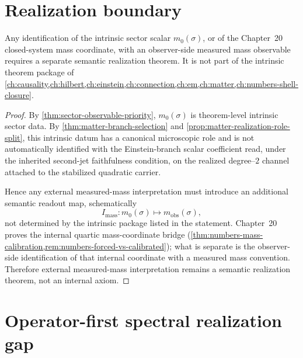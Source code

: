 \section{Realization boundary}
\label{sec:matter-realization-boundary}

\begin{corollary}
\label{cor:mass-boundary}
\label{cor:boundary}
Any identification of the intrinsic sector scalar \(m_0(\sigma)\), or of
the Chapter~20 closed-system mass coordinate, with an observer-side measured
mass observable requires a separate semantic realization theorem.
It is not part of the intrinsic theorem package of
\cref{ch:causality,ch:hilbert,ch:einstein,ch:connection,ch:em,ch:matter,ch:numbers-shell-closure}.
\end{corollary}

\begin{proof}
By \cref{thm:sector-observable-priority},
\(m_0(\sigma)\) is theorem-level intrinsic sector data.
By \cref{thm:matter-branch-selection} and
\cref{prop:matter-realization-role-split}, this intrinsic datum has a
canonical microscopic role and is not automatically identified with
the Einstein-branch scalar coefficient read, under the inherited
second-jet faithfulness condition, on the realized degree--\(2\)
channel attached to the stabilized quadratic carrier.

Hence any external measured-mass interpretation must introduce an additional
semantic readout map, schematically
\[
  I_{\mathrm{mass}}:
  m_0(\sigma)
  \longmapsto
  m_{\mathrm{obs}}(\sigma),
\]
not determined by the intrinsic package listed in the statement.
Chapter~20 proves the internal quartic mass-coordinate bridge
(\cref{thm:numbers-mass-calibration,rem:numbers-forced-vs-calibrated}); what is
separate is the observer-side identification of that internal coordinate with
a measured mass convention.  Therefore external measured-mass interpretation
remains a semantic realization theorem, not an internal axiom.
\end{proof}

\section{Operator-first spectral realization gap}
\label{sec:matter-realization-gap}

